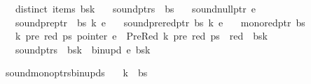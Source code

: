 \begin{isabellebody}
\ \ \ {\isachardoublequoteopen}distinct\ {\isacharparenleft}{\kern0pt}items\ {\isacharparenleft}{\kern0pt}bs{\isacharbang}{\kern0pt}k{\isacharparenright}{\kern0pt}{\isacharparenright}{\kern0pt}{\isachardoublequoteclose}\isanewline
\ \ \ {\isachardoublequoteopen}sound{\isacharunderscore}{\kern0pt}ptrs\ {\isasymomega}\ bs{\isachardoublequoteclose}\isanewline
\ \ \ {\isachardoublequoteopen}sound{\isacharunderscore}{\kern0pt}null{\isacharunderscore}{\kern0pt}ptr\ e{\isachardoublequoteclose}\isanewline
\ \ \ {\isachardoublequoteopen}sound{\isacharunderscore}{\kern0pt}pre{\isacharunderscore}{\kern0pt}ptr\ {\isasymomega}\ bs\ k\ e{\isachardoublequoteclose}\isanewline
\ \ \ {\isachardoublequoteopen}sound{\isacharunderscore}{\kern0pt}prered{\isacharunderscore}{\kern0pt}ptr\ bs\ k\ e{\isachardoublequoteclose}\isanewline
\ \ \ {\isachardoublequoteopen}mono{\isacharunderscore}{\kern0pt}red{\isacharunderscore}{\kern0pt}ptr\ bs{\isachardoublequoteclose}\isanewline
\ \ \ {\isachardoublequoteopen}{\isasymforall}k{\isacharprime}{\kern0pt}\ pre\ red\ ps{\isachardot}{\kern0pt}\ pointer\ e\ {\isacharequal}{\kern0pt}\ PreRed\ {\isacharparenleft}{\kern0pt}k{\isacharprime}{\kern0pt}{\isacharcomma}{\kern0pt}\ pre{\isacharcomma}{\kern0pt}\ red{\isacharparenright}{\kern0pt}\ ps\ {\isasymlongrightarrow}\ red\ {\isacharless}{\kern0pt}\ {\isacharbar}{\kern0pt}bs{\isacharbang}{\kern0pt}k{\isacharbar}{\kern0pt}{\isachardoublequoteclose}\isanewline
\ \ \ {\isachardoublequoteopen}sound{\isacharunderscore}{\kern0pt}ptrs\ {\isasymomega}\ {\isacharparenleft}{\kern0pt}bs{\isacharbrackleft}{\kern0pt}k\ {\isacharcolon}{\kern0pt}{\isacharequal}{\kern0pt}\ bin{\isacharunderscore}{\kern0pt}upd\ e\ {\isacharparenleft}{\kern0pt}bs{\isacharbang}{\kern0pt}k{\isacharparenright}{\kern0pt}{\isacharbrackright}{\kern0pt}{\isacharparenright}{\kern0pt}{\isachardoublequoteclose}%
\isadelimproof
%
\endisadelimproof
%
\isatagproof
%
\endisatagproof
{\isafoldproof}%
%
\isadelimproof
%
\endisadelimproof
%
\begin{isamarkuptext}%
%
\end{isamarkuptext}\isamarkuptrue%
\isamarkupfalse%
\ sound{\isacharunderscore}{\kern0pt}mono{\isacharunderscore}{\kern0pt}ptrs{\isacharunderscore}{\kern0pt}bin{\isacharunderscore}{\kern0pt}upds{\isacharcolon}{\kern0pt}\isanewline
\ \ \ {\isachardoublequoteopen}k\ {\isacharless}{\kern0pt}\ {\isacharbar}{\kern0pt}bs{\isacharbar}{\kern0pt}{\isachardoublequoteclose}\isanewline

\end{isabellebody}
